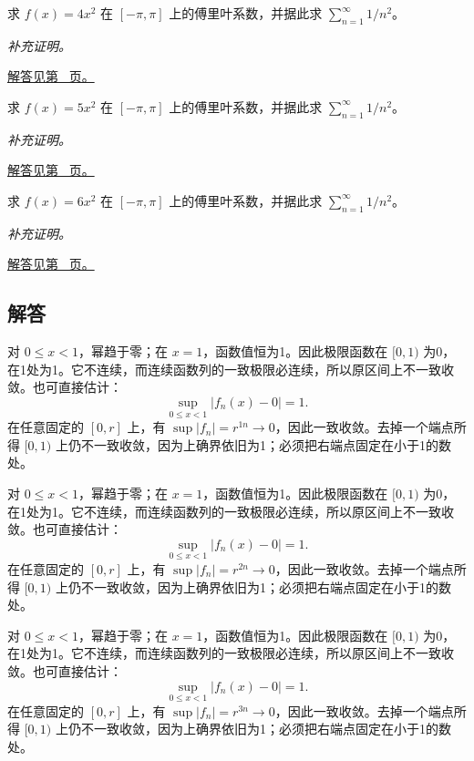 \documentclass[12pt,fontset=fandol]{ctexart}
\begin{document}
\begin{example}[平方函数的余弦展开]\label{ex:c28q22}
求 $f(x)=4x^2$ 在 $[-\pi,\pi]$ 上的傅里叶系数，并据此求 $\sum_{n=1}^\infty1/n^2$。
\par\textit{补充证明。}\par\hyperref[ans:c28q22]{解答见第~\pageref{ans:c28q22} 页。}
\end{example}
\begin{example}[平方函数的余弦展开]\label{ex:c28q23}
求 $f(x)=5x^2$ 在 $[-\pi,\pi]$ 上的傅里叶系数，并据此求 $\sum_{n=1}^\infty1/n^2$。
\par\textit{补充证明。}\par\hyperref[ans:c28q23]{解答见第~\pageref{ans:c28q23} 页。}
\end{example}
\begin{example}[平方函数的余弦展开]\label{ex:c28q24}
求 $f(x)=6x^2$ 在 $[-\pi,\pi]$ 上的傅里叶系数，并据此求 $\sum_{n=1}^\infty1/n^2$。
\par\textit{补充证明。}\par\hyperref[ans:c28q24]{解答见第~\pageref{ans:c28q24} 页。}
\end{example}
\subsection{解答}
\begin{solve}\label{ans:c28q1}
对 $0\le x<1$，幂趋于零；在 $x=1$，函数值恒为1。因此极限函数在 $[0,1)$ 为0，在1处为1。它不连续，而连续函数列的一致极限必连续，所以原区间上不一致收敛。也可直接估计：
\[
\sup_{0\le x<1}|f_n(x)-0|=1.
\]
在任意固定的 $[0,r]$ 上，有 $\sup|f_n|=r^{1n}\to0$，因此一致收敛。去掉一个端点所得 $[0,1)$ 上仍不一致收敛，因为上确界依旧为1；必须把右端点固定在小于1的数处。
\end{solve}

\begin{solve}\label{ans:c28q2}
对 $0\le x<1$，幂趋于零；在 $x=1$，函数值恒为1。因此极限函数在 $[0,1)$ 为0，在1处为1。它不连续，而连续函数列的一致极限必连续，所以原区间上不一致收敛。也可直接估计：
\[
\sup_{0\le x<1}|f_n(x)-0|=1.
\]
在任意固定的 $[0,r]$ 上，有 $\sup|f_n|=r^{2n}\to0$，因此一致收敛。去掉一个端点所得 $[0,1)$ 上仍不一致收敛，因为上确界依旧为1；必须把右端点固定在小于1的数处。
\end{solve}

\begin{solve}\label{ans:c28q3}
对 $0\le x<1$，幂趋于零；在 $x=1$，函数值恒为1。因此极限函数在 $[0,1)$ 为0，在1处为1。它不连续，而连续函数列的一致极限必连续，所以原区间上不一致收敛。也可直接估计：
\[
\sup_{0\le x<1}|f_n(x)-0|=1.
\]
在任意固定的 $[0,r]$ 上，有 $\sup|f_n|=r^{3n}\to0$，因此一致收敛。去掉一个端点所得 $[0,1)$ 上仍不一致收敛，因为上确界依旧为1；必须把右端点固定在小于1的数处。
\end{solve}
\end{document}
